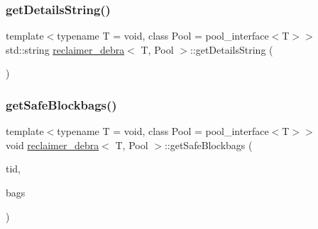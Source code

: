 \mbox{\label{classreclaimer__debra_a34e1d02bd691d3f889c38aa2c026ebbc}} 
\subsubsection{\texorpdfstring{get\+Details\+String()}{getDetailsString()}}
{\footnotesize\ttfamily template$<$typename T  = void, class Pool  = pool\+\_\+interface$<$\+T$>$$>$ \\
std\+::string \hyperlink{classreclaimer__debra}{reclaimer\+\_\+debra}$<$ T, Pool $>$\+::get\+Details\+String (\begin{DoxyParamCaption}{ }\end{DoxyParamCaption})\hspace{0.3cm}{\ttfamily [inline]}}

\mbox{\label{classreclaimer__debra_a5805415266e40f98b9fb4b403bf6552f}} 
\subsubsection{\texorpdfstring{get\+Safe\+Blockbags()}{getSafeBlockbags()}}
{\footnotesize\ttfamily template$<$typename T  = void, class Pool  = pool\+\_\+interface$<$\+T$>$$>$ \\
void \hyperlink{classreclaimer__debra}{reclaimer\+\_\+debra}$<$ T, Pool $>$\+::get\+Safe\+Blockbags (\begin{DoxyParamCaption}\item[{const int}]{tid,  }\item[{\hyperlink{classblockbag}{blockbag}$<$ T $>$ $\ast$$\ast$}]{bags }\end{DoxyParamCaption})\hspace{0.3cm}{\ttfamily [inline]}}

\mbox{\label{classreclaimer__debra_a1f38d639ddc7801216d7add73d9e422b}} 
